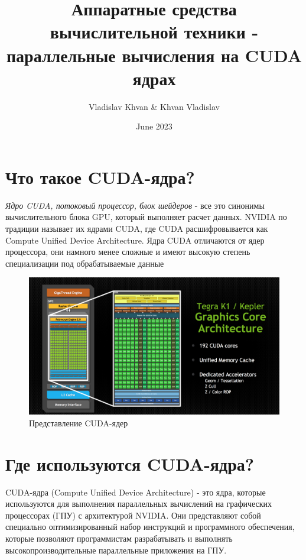\documentclass[a4paper, 12pt]{article}
\title{Аппаратные средства вычислительной техники - параллельные вычисления на CUDA ядрах}
\author{Vladislav Khvan & Khvan Vladislav}
\date{June 2023}
\begin{document}
\maketitle %

\newpage

\section{Что такое CUDA-ядра?}
\textit{Ядро CUDA, потоковый процессор, блок шейдеров} - все это синонимы вычислительного блока GPU, который выполняет расчет данных. NVIDIA по традиции называет их ядрами CUDA, где CUDA расшифровывается как Compute Unified Device Architecture. Ядра CUDA отличаются от ядер процессора, они намного менее сложные и имеют высокую степень специализации под обрабатываемые данные
    \begin{figure}[h]
        \centering
        \includegraphics[width=\textwidth]{CUDA-previev.png}
        \caption{Представление CUDA-ядер}
        \label{fig:CUDA-previev}
    \end{figure}

\section{Где используются CUDA-ядра?}

CUDA-ядра (Compute Unified Device Architecture) - это ядра, которые используются для выполнения параллельных вычислений на графических процессорах (ГПУ) с архитектурой NVIDIA. Они представляют собой специально оптимизированный набор инструкций и программного обеспечения, которые позволяют программистам разрабатывать и выполнять высокопроизводительные параллельные приложения на ГПУ.
\end{document}
